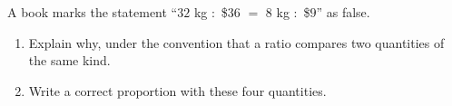 A book marks the statement ``$32$ kg $:$ \$$36$ $=$ $8$ kg $:$ \$$9$'' as false.
\begin{enumerate}
\item[(a)] Explain why, under the convention that a ratio compares two quantities of the same kind.
\item[(b)] Write a correct proportion with these four quantities.
\end{enumerate}
